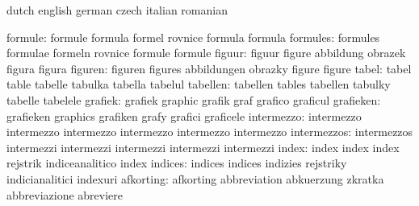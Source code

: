 \startvariables            dutch                     english
                           german                    czech
                           italian                   romanian

                  formule: formule                   formula
                           formel                    rovnice
                           formula                   formula
                 formules: formules                  formulae
                           formeln                   rovnice
                           formule                   formule
                   figuur: figuur                    figure
                           abbildung                 obrazek
                           figura                    figura
                  figuren: figuren                   figures
                           abbildungen               obrazky
                           figure                    figure
                    tabel: tabel                     table
                           tabelle                   tabulka
                           tabella                   tabelul
                 tabellen: tabellen                  tables
                           tabellen                  tabulky
                           tabelle                   tabelele
                  grafiek: grafiek                   graphic
                           grafik                    graf
                           grafico                   graficul
                grafieken: grafieken                 graphics
                           grafiken                  grafy
                           grafici                   graficele
               intermezzo: intermezzo                intermezzo
                           intermezzo                intermezzo
                           intermezzo                intermezzo
              intermezzos: intermezzos               intermezzi
                           intermezzi                intermezzi
                           intermezzi                intermezzi
                    index: index                     index
                           index                     rejstrik
                           indiceanalitico           index
                  indices: indices                   indices
                           indizies                  rejstriky
                           indicianalitici           indexuri
                afkorting: afkorting                 abbreviation
                           abkuerzung                zkratka
                           abbreviazione             abreviere
